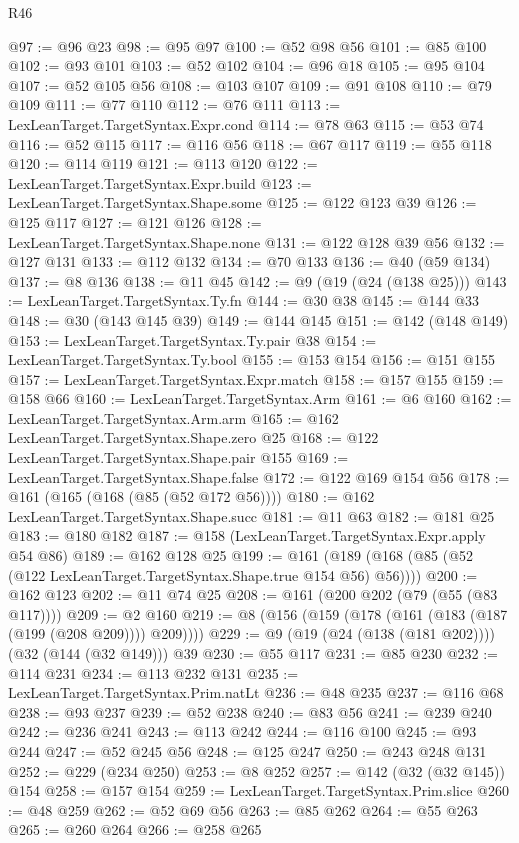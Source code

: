 \begin{lexlean}{R46}
\begin{coremodule}
@97 := @96 @23
@98 := @95 @97
@100 := @52 @98 @56
@101 := @85 @100
@102 := @93 @101
@103 := @52 @102
@104 := @96 @18
@105 := @95 @104
@107 := @52 @105 @56
@108 := @103 @107
@109 := @91 @108
@110 := @79 @109
@111 := @77 @110
@112 := @76 @111
@113 := LexLeanTarget.TargetSyntax.Expr.cond
@114 := @78 @63
@115 := @53 @74
@116 := @52 @115
@117 := @116 @56
@118 := @67 @117
@119 := @55 @118
@120 := @114 @119
@121 := @113 @120
@122 := LexLeanTarget.TargetSyntax.Expr.build
@123 := LexLeanTarget.TargetSyntax.Shape.some
@125 := @122 @123 @39
@126 := @125 @117
@127 := @121 @126
@128 := LexLeanTarget.TargetSyntax.Shape.none
@131 := @122 @128 @39 @56
@132 := @127 @131
@133 := @112 @132
@134 := @70 @133
@136 := @40 (@59 @134)
@137 := @8 @136
@138 := @11 @45
@142 := @9 (@19 (@24 (@138 @25)))
@143 := LexLeanTarget.TargetSyntax.Ty.fn
@144 := @30 @38
@145 := @144 @33
@148 := @30 (@143 @145 @39)
@149 := @144 @145
@151 := @142 (@148 @149)
@153 := LexLeanTarget.TargetSyntax.Ty.pair @38
@154 := LexLeanTarget.TargetSyntax.Ty.bool
@155 := @153 @154
@156 := @151 @155
@157 := LexLeanTarget.TargetSyntax.Expr.match
@158 := @157 @155
@159 := @158 @66
@160 := LexLeanTarget.TargetSyntax.Arm
@161 := @6 @160
@162 := LexLeanTarget.TargetSyntax.Arm.arm
@165 := @162 LexLeanTarget.TargetSyntax.Shape.zero @25
@168 := @122 LexLeanTarget.TargetSyntax.Shape.pair @155
@169 := LexLeanTarget.TargetSyntax.Shape.false
@172 := @122 @169 @154 @56
@178 := @161 (@165 (@168 (@85 (@52 @172 @56))))
@180 := @162 LexLeanTarget.TargetSyntax.Shape.succ
@181 := @11 @63
@182 := @181 @25
@183 := @180 @182
@187 := @158 (LexLeanTarget.TargetSyntax.Expr.apply @54 @86)
@189 := @162 @128 @25
@199 := @161 (@189 (@168 (@85 (@52 (@122 LexLeanTarget.TargetSyntax.Shape.true @154 @56) @56))))
@200 := @162 @123
@202 := @11 @74 @25
@208 := @161 (@200 @202 (@79 (@55 (@83 @117))))
@209 := @2 @160
@219 := @8 (@156 (@159 (@178 (@161 (@183 (@187 (@199 (@208 @209)))) @209))))
@229 := @9 (@19 (@24 (@138 (@181 @202)))) (@32 (@144 (@32 @149))) @39
@230 := @55 @117
@231 := @85 @230
@232 := @114 @231
@234 := @113 @232 @131
@235 := LexLeanTarget.TargetSyntax.Prim.natLt
@236 := @48 @235
@237 := @116 @68
@238 := @93 @237
@239 := @52 @238
@240 := @83 @56
@241 := @239 @240
@242 := @236 @241
@243 := @113 @242
@244 := @116 @100
@245 := @93 @244
@247 := @52 @245 @56
@248 := @125 @247
@250 := @243 @248 @131
@252 := @229 (@234 @250)
@253 := @8 @252
@257 := @142 (@32 (@32 @145)) @154
@258 := @157 @154
@259 := LexLeanTarget.TargetSyntax.Prim.slice
@260 := @48 @259
@262 := @52 @69 @56
@263 := @85 @262
@264 := @55 @263
@265 := @260 @264
@266 := @258 @265

\end{coremodule}
\end{lexlean}
